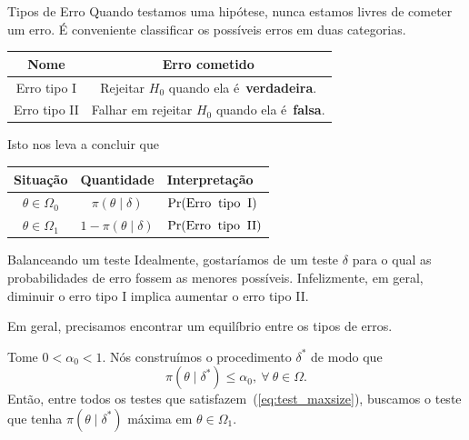 \begin{frame}{Tipos de Erro}
 Quando testamos uma hipótese, nunca estamos livres de cometer um erro.
 É conveniente classificar os possíveis erros em duas categorias.
 \begin{defn}
 \label{def:error_types}
 \begin{center}
  \begin{tabular}{cc}
   Nome & Erro cometido\\
   \hline
   Erro tipo I & Rejeitar $H_0$ quando ela é~\textbf{verdadeira}.\\
   Erro tipo II & Falhar em rejeitar $H_0$ quando ela é~\textbf{falsa}.\\
   \hline
  \end{tabular}
 \end{center}  
 \end{defn}
Isto nos leva a concluir que
\begin{center}
  \begin{tabular}{ccl}
   Situação & Quantidade & Interpretação\\
   \hline
    $\theta \in \Omega_0$ & $\pi(\theta \mid \delta)$ & $\operatorname{Pr}(\text{Erro\: tipo\: I})$ \\
    $\theta \in \Omega_1$ & $1-\pi(\theta \mid \delta)$& $\operatorname{Pr}(\text{Erro\: tipo\: II})$\\
   \hline
  \end{tabular}
\end{center} 
 \end{frame}

\begin{frame}{Balanceando um teste}
 Idealmente, gostaríamos de um teste $\delta$ para o qual as probabilidades de erro fossem as menores possíveis. 
 Infelizmente, em geral, diminuir o erro tipo I implica aumentar o erro tipo II. 

 Em geral, precisamos encontrar um equilíbrio entre os tipos de erros.
 \begin{ideia}
 \label{idea:balancing_typeI_and_typeII}
  Tome $0 < \alpha_0 < 1$.
  Nós construímos o procedimento $\delta^\ast$ de modo que
  \begin{equation}
  \label{eq:test_maxsize}
   \pi(\theta \mid \delta^\ast) \leq \alpha_0, \: \forall\: \theta \in \Omega.
  \end{equation}
 Então, entre todos os testes que satisfazem~(\ref{eq:test_maxsize}), buscamos o teste que tenha $\pi(\theta \mid \delta^\ast)$ máxima em $\theta \in \Omega_1$.
 \end{ideia}
\end{frame}
 
